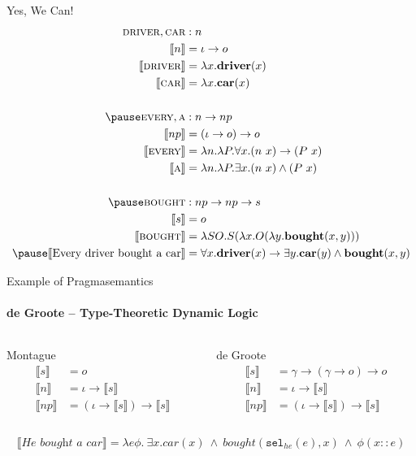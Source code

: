 \documentclass{beamer}
\newcommand{\occons}{\mathbin{::}}
\newcommand{\sem}[1]{\llbracket #1 \rrbracket}
\newcommand{\semdom}[1]{\textbf{#1}}
\begin{document}
\begin{frame}{Yes, We Can!}
  \vspace{-5mm}
  \begin{align*}
    \textsc{driver}, \textsc{car} &: n \\
    \sem{n} &= \iota \to o \\
    \sem{\textsc{driver}} &= \lambda x. \semdom{driver}(x) \\
    \sem{\textsc{car}} &= \lambda x. \semdom{car}(x) \\
    \\ \pause
    \textsc{every}, \textsc{a} &: n \to np \\
    \sem{np} &= (\iota \to o) \to o \\
    \sem{\textsc{every}} &= \lambda n. \lambda P. \forall x. (n\ x) \rightarrow (P\ x) \\
    \sem{\textsc{a}} &= \lambda n. \lambda P. \exists x. (n\ x) \land (P\ x) \\
    \\ \pause
    \textsc{bought} &: np \to np \to s \\
    \sem{s} &= o \\
    \sem{\textsc{bought}} &= \lambda S O. S (\lambda x. O (\lambda y. \semdom{bought}(x, y))) \\
    \pause
    \sem{\text{Every driver bought a car}} &= \forall x. \semdom{driver}(x) \rightarrow \exists y. \semdom{car}(y) \land \semdom{bought}(x, y)
  \end{align*}
\end{frame}


\begin{frame}{Example of Pragmasemantics}
  \framesubtitle{de Groote -- Type-Theoretic Dynamic Logic}
  \begin{columns}
    \begin{column}{0.5\textwidth}
      \begin{block}{Montague}
        \begin{align*}
          \sem{s} &= o \\
          \sem{n} &= \iota \to \sem{s} \\
          \sem{np} &= (\iota \to \sem{s}) \to \sem{s}
        \end{align*}
      \end{block}
    \end{column}
    \begin{column}{0.5\textwidth}
      \begin{block}{de Groote}
         \begin{align*}
          \sem{s} &= \gamma \to (\gamma \to o) \to o \\
          \sem{n} &= \iota \to \sem{s} \\
          \sem{np} &= (\iota \to \sem{s}) \to \sem{s}
        \end{align*}
      \end{block}
    \end{column}
  \end{columns}
  \vfill
  \pause
  $$
  \sem{\textit{He bought a car}} = \lambda e \phi.\ \exists
  x. car(x)\ \land\ bought(\texttt{sel}_{he}(e), x)\ \land\ \phi (x \occons e)
  $$
\end{frame}
\end{document}
